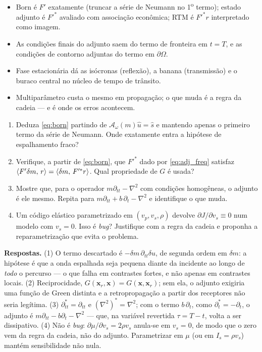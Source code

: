 \documentclass[11pt,a4paper,oneside]{report}
\begin{document}
\begin{resumo}
\begin{itemize}[leftmargin=*, itemsep=1pt]
\item Born \'e $F'$ exatamente (truncar a s\'erie de Neumann no 1\textsuperscript{o}
termo); estado adjunto \'e $F'^{*}$ avaliado com associa\c{c}\~ao econ\^omica;
RTM \'e $F'^{*}r$ interpretado como imagem.
\item As condi\c{c}\~oes finais do adjunto saem do termo de fronteira em
$t=T$, e as condi\c{c}\~oes de contorno adjuntas do termo em $\partial\Omega$.
\item Fase estacion\'aria d\'a as is\'ocronas (reflex\~ao), a banana
(transmiss\~ao) e o buraco central no n\'ucleo de tempo de tr\^ansito.
\item Multipar\^ametro custa o mesmo em propaga\c{c}\~ao; o que muda \'e a
regra da cadeia --- e \'e onde os erros acontecem.
\end{itemize}
\end{resumo}

\begin{exercicio}[Problemas]
\begin{enumerate}[leftmargin=*, itemsep=2pt]
\item Deduza \eqref{eq:born} partindo de $\mathcal{A}_\omega(m)\hat u = \hat s$
e mantendo apenas o primeiro termo da s\'erie de Neumann. Onde exatamente
entra a hip\'otese de espalhamento fraco?
\item Verifique, a partir de \eqref{eq:born}, que $F'^{*}$ dado por
\eqref{eq:adj_freq} satisfaz $\langle F'\delta m,\,r\rangle = \langle \delta m,\,F'^{*}r\rangle$.
Qual propriedade de $G$ \'e usada?
\item Mostre que, para o operador $m\partial_{tt}-\nabla^{2}$ com
condi\c{c}\~oes homog\^eneas, o adjunto \'e ele mesmo. Repita para
$m\partial_{tt} + b\,\partial_t - \nabla^{2}$ e identifique o que muda.
\item Um c\'odigo el\'astico parametrizado em $(v_p,v_s,\rho)$ devolve
$\partial J/\partial v_s \equiv 0$ num modelo com $v_s = 0$. Isso \'e
\emph{bug}? Justifique com a regra da cadeia e proponha a reparametriza\c{c}\~ao
que evita o problema.
\end{enumerate}
\textbf{Respostas.} (1) O termo descartado \'e
$-\delta m\,\partial_{tt}\delta u$, de segunda ordem em $\delta m$: a
hip\'otese \'e que a onda espalhada seja pequena diante da incidente ao longo
de \emph{todo} o percurso --- o que falha em contrastes fortes, e n\~ao apenas
em contrastes locais. (2) Reciprocidade,
$G(\mathbf{x}_r,\mathbf{x}) = G(\mathbf{x},\mathbf{x}_r)$; sem ela, o adjunto
exigiria uma fun\c{c}\~ao de Green distinta e a retropropaga\c{c}\~ao a partir
dos receptores n\~ao seria leg\'itima. (3) $\partial_{tt}^{*}=\partial_{tt}$ e
$(\nabla^{2})^{*}=\nabla^{2}$; com o termo $b\,\partial_t$, como
$\partial_t^{*}=-\partial_t$, o adjunto \'e $m\partial_{tt}-b\partial_t-\nabla^{2}$
--- que, na vari\'avel revertida $\tau = T-t$, volta a ser dissipativo.
(4) N\~ao \'e \emph{bug}: $\partial\mu/\partial v_s = 2\rho v_s$ anula-se em
$v_s=0$, de modo que o zero vem da regra da cadeia, n\~ao do adjunto.
Parametrizar em $\mu$ (ou em $I_s = \rho v_s$) mant\'em sensibilidade n\~ao
nula.
\end{exercicio}
\end{document}
